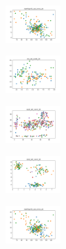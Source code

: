 \begin{figure}[H]
\begin{subfigure}
    \end{subfigure}
    \hfill
    \begin{subfigure}
        \centering
        \includegraphics[width=0.234\textwidth]{img/hs/newthyroid_set_const_20_277451237_clust.png}
    \end{subfigure}
    \hfill
    \begin{subfigure}
        \centering
        \includegraphics[width=0.234\textwidth]{img/hs/iris_set_const_20_49258669_clust.png}
    \end{subfigure}
    \hfill
    \begin{subfigure}
        \centering
        \includegraphics[width=0.234\textwidth]{img/hs/ecoli_set_const_20_49258669_clust.png}
    \end{subfigure}
    \hfill
    \begin{subfigure}
        \centering
        \includegraphics[width=0.234\textwidth]{img/hs/rand_set_const_20_49258669_clust.png}
    \end{subfigure}
    \hfill
    \begin{subfigure}
        \centering
        \includegraphics[width=0.234\textwidth]{img/hs/newthyroid_set_const_20_49258669_clust.png}
    \end{subfigure}
    \hfill
    \begin{subfigure}

\end{subfigure}
\end{figure}
